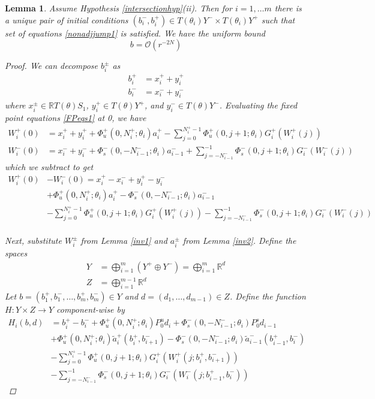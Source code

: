 \documentclass[12pt]{article}
\def\R{{\mathbb R}}
\newtheorem{lemma}{Lemma}
\begin{document}
\begin{lemma}\label{inv3nt}
Assume Hypothesis \ref{intersectionhyp}(ii). Then for $i = 1, \dots m$ there is a unique pair of initial conditions $(b_i^-, b_i^+) \in T(\theta_i) Y^- \times T(\theta_i) Y^+$ such that set of equations \eqref{nonadjjump1} is satisfied. We have the uniform bound
\begin{equation}\label{bboundnt}
b = \mathcal{O}(r^{-2N})
\end{equation}

\begin{proof}
We can decompose $b_i^\pm$ as
\begin{align*}
b_i^+ &= x_i^+ + y_i^+ \\
b_i^- &= x_i^- + y_i^-
\end{align*} 
where $x_i^\pm \in \R T(\theta)S_1$, $y_i^+ \in T(\theta)Y^+$, and $y_i^- \in T(\theta)Y^-$. Evaluating the fixed point equations \eqref{FPeqs1} at 0, we have
\begin{align*}
W_i^+(0) &= x_i^+ + y_i^+ + \Phi_u^+(0, N_i^+; \theta_i) a_i^+ - \sum_{j = 0}^{N_i^+-1} \Phi_u^+(0, j+1; \theta_i) G_i^+(W_i^+(j)) \\
W_i^-(0) &= x_i^- + y_i^- + \Phi_s^-(0, -N_{i-1}^-; \theta_i) a_{i-1}^- 
+ \sum_{j = -N_{i-1}^-}^{-1} \Phi_s^-(0, j+1; \theta_i) G_i^-(W_i^-(j))
\end{align*}
which we subtract to get
\begin{align*}
W_i^+(0) &- W_i^-(0) = x_i^+ - x_i^- + y_i^+ - y_i^- \\
&+ \Phi_u^+(0, N_i^+; \theta_i) a_i^+ - \Phi_s^-(0, -N_{i-1}^-; \theta_i) a_{i-1}^- \\
&- \sum_{j = 0}^{N_i^+-1} \Phi_u^+(0, j+1; \theta_i) G_i^+(W_i^+(j)) 
- \sum_{j = -N_{i-1}^-}^{-1} \Phi_s^-(0, j+1; \theta_i) G_i^-(W_i^-(j)) \\
\end{align*}




Next, substitute $W_i^\pm$ from Lemma \ref{inv1} and $a_i^\pm$ from Lemma \ref{inv2}. Define the spaces
\begin{align}\label{spaceYt}
Y &= \bigoplus_{i=1}^m (Y^+ \oplus Y^-) = \bigoplus_{i=1}^m \R^d \\
Z &= \bigoplus_{i=1}^{m-1} \R^d
\end{align}
Let $b = (b_1^+, b_1^-, \dots, b_m^+, b_m^-) \in Y$ and $d = (d_1, \dots, d_{m-1}) \in Z$. Define the function $H: Y \times Z \rightarrow Y$ component-wise by
\begin{align*}
H_i(b, d) &= 
 b_i^+ - b_i^- + \Phi_u^+(0, N_i^+; \theta_i) P_0^u d_i + \Phi_s^-(0, -N_{i-1}^-; \theta_i) P_0^s d_{i-1} \\
&+ \Phi_u^+(0, N_i^+; \theta_i) \tilde{a}_i^+(b_i^+, b_{i+1}^-) 
- \Phi_s^-(0, -N_{i-1}^-; \theta_i) \tilde{a}_{i-1}^-(b_{i-1}^+, b_i^-) \\
&- \sum_{j = 0}^{N_i^+-1} \Phi_u^+(0, j+1; \theta_i) G_i^+(W_i^+(j; b_i^+, b_{i+1}^-)) \\
&- \sum_{j = -N_{i-1}^-}^{-1} \Phi_s^-(0, j+1; \theta_i) G_i^-(W_i^-(j; b_{i-1}^+, b_i^-))
\end{align*}


\end{proof}
\end{lemma}
\end{document}
